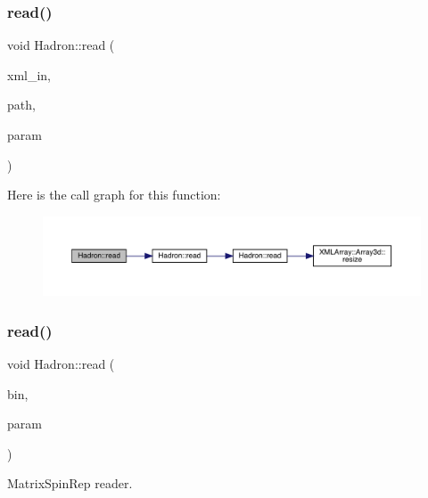 \subsubsection{\texorpdfstring{read()}{read()}\hspace{0.1cm}{\footnotesize\ttfamily [36/94]}}
{\footnotesize\ttfamily void Hadron\+::read (\begin{DoxyParamCaption}\item[{\mbox{\hyperlink{classADATXML_1_1XMLReader}{X\+M\+L\+Reader}} \&}]{xml\+\_\+in,  }\item[{const std\+::string \&}]{path,  }\item[{\mbox{\hyperlink{structHadron_1_1HadronDiagramTimeSlices__t}{Hadron\+Diagram\+Time\+Slices\+\_\+t}} \&}]{param }\end{DoxyParamCaption})}

Here is the call graph for this function\+:
\nopagebreak
\begin{figure}[H]
\begin{center}
\leavevmode
\includegraphics[width=350pt]{d1/daf/namespaceHadron_ae5cdeeff0a8ced82bfb5f5a46595faf8_cgraph}
\end{center}
\end{figure}
\mbox{\label{namespaceHadron_af8ce56081c184ce7dd924a192bff08a6}} 
\subsubsection{\texorpdfstring{read()}{read()}\hspace{0.1cm}{\footnotesize\ttfamily [37/94]}}
{\footnotesize\ttfamily void Hadron\+::read (\begin{DoxyParamCaption}\item[{\mbox{\hyperlink{classADATIO_1_1BinaryReader}{Binary\+Reader}} \&}]{bin,  }\item[{\mbox{\hyperlink{structHadron_1_1MatrixSpinRep__t}{Matrix\+Spin\+Rep\+\_\+t}} \&}]{param }\end{DoxyParamCaption})}



Matrix\+Spin\+Rep reader. 

